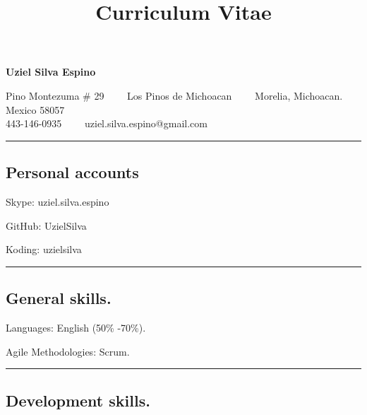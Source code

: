\documentclass[10pt,letterpaper]{article}
\title{Curriculum Vitae}
\newenvironment{indentsection}[1]%
{\begin{list}{}%
	{\setlength{\leftmargin}{#1}}%
	\item[]%
}
{\end{list}}
\begin{document}
\begin{center}
{\LARGE \textbf{Uziel Silva Espino}}

Pino Montezuma \# 29\ \ \textbullet
\ \ Los Pinos de Michoacan\ \ \textbullet
\ \ Morelia, Michoacan. Mexico 58057
\\
443-146-0935\ \ \textbullet
\ \ uziel.silva.espino@gmail.com
\end{center}

\hrule
\vspace{-0.9em}
\subsection*{Personal accounts}

\begin{indentsection}{\parindent}
\begin{description*}
	\item[Skype:]
	uziel.silva.espino
	\item[GitHub:]
	UzielSilva
	\item[Koding:]
	uzielsilva
	
\end{description*}
\end{indentsection}

\hrule
\vspace{-0.4em}
\subsection*{General skills.}

\begin{indentsection}{\parindent}
\begin{description*}
	\item[Languages:] 
    English (50\% -70\%).
    
    \item[Agile Methodologies:]
    Scrum.
	
\end{description*}
\end{indentsection}

\hrule
\vspace{-0.4em}
\subsection*{Development skills.}
\end{document}
